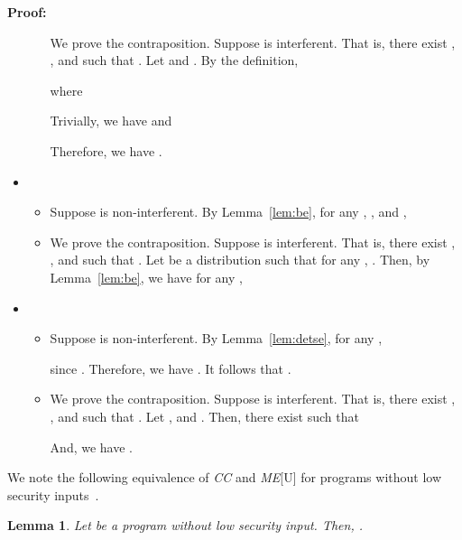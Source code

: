 \documentclass{llncs}
\newtheorem{lemma}[theorem]{Lemma}
\newenvironment{proof}{\noindent\rm{\bf Proof:}}{\hbox{}\vspace*{0.2\baselineskip}}
\begin{document}
\begin{proof}
\begin{itemize}
\begin{itemize}
  We prove the contraposition.  Suppose  is interferent.  That is,
  there exist , , and  such that
  .  Let  and
  .  By the definition,

where 

Trivially, we have  and

Therefore, we have .
\end{itemize}

\item 
\begin{itemize}
\item 

Suppose  is non-interferent.  By Lemma~\ref{lem:be}, for any
, , and ,

\item 

  We prove the contraposition. Suppose  is interferent.  That is,
  there exist , , and  such that
  .  Let  be a distribution such
  that for any , .  Then, by Lemma~\ref{lem:be}, we
  have for any ,

\end{itemize}

\item 
\begin{itemize}
\item 

  Suppose  is non-interferent.  By Lemma~\ref{lem:detse}, for any
  ,

since .  Therefore, we have .  It follows that .
\item 

  We prove the contraposition. Suppose  is interferent.  That is, there
  exist , , and  such that
  .  Let , and
  .  Then, there exist  such that 

And, we have .
\end{itemize}

\end{itemize}
\end{proof}

We note the following equivalence of {\it CC} and {\it ME}[U] for
programs without low security inputs~\cite{smith09}.
\begin{lemma}
\label{lem:ccme}
Let  be a program without low security input.  Then, 
.

\end{lemma}
\end{document}
